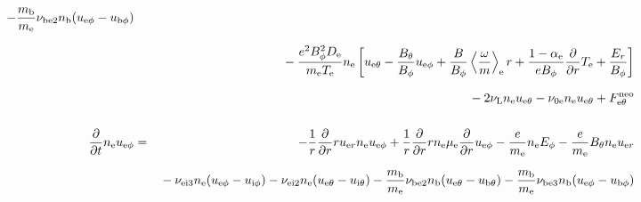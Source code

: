 \documentclass[11pt]{article}
\def\r#1{{\rm#1}}
\def\ddt{\frac{\partial}{\partial t}}
\def\ddr{\frac{\partial}{\partial r}}
\def\ave#1{\left\langle#1\right\rangle}
\def\me{m_\r{e}}
\def\mb{m_\r{b}}
\def\mue{\mu_\r{e}}
\def\mui{\mu_\r{i}}
\def\De{D_\r{e}}
\def\Di{D_\r{i}}
\def\nee{n_\r{e}}
\def\ni{n_\r{i}}
\def\nb{n_\r{b}}
\def\uer{u_{\r{e}r}}
\def\ueth{u_{\r{e}\theta}}
\def\uith{u_{\r{i}\theta}}
\def\ubth{u_{\r{b}\theta}}
\def\ueph{u_{\r{e}\phi}}
\def\uiph{u_{\r{i}\phi}}
\def\ubph{u_{\r{b}\phi}}
\def\Er{E_r}
\def\Eph{E_\phi}
\def\Bth{B_\theta}
\def\Bph{B_\phi}
\def\Te{T_\r{e}}
\def\Ti{T_\r{i}}
\def\Zi{Z_\r{i}}
\def\nune{\nu_\r{0e}}
\def\nuL{\nu_\r{L}}
\newcommand{\Frac}[2]{%
  {\displaystyle {\displaystyle #1\over \displaystyle #2}}%
}
\newcommand{\rdprd}[2]{\Frac{\partial #1}{\partial #2}}
\newcommand{\aveaveB}[1]{\left< \!\! \left< #1 \right> \!\! \right>}
\begin{document}
\begin{eqnarray}
%
  - \frac{\mb}{\me} \nu_\r{be2} \nb (\ueph - \ubph)
\nonumber\\[2.5mm]&&{}
%
%
  - \frac{e^2 \Bph^2 \De}{\me\Te}\nee
    \left[\ueth - \frac{\Bth}{\Bph}\ueph
     + \frac{B}{\Bph}\ave{\frac{\omega}{m}}_\r{e} r
     + \frac{1-\alpha_\r{e}}{e\Bph}\ddr \Te + \frac{\Er}{\Bph}\right]
%
\nonumber\\[2.5mm]&&{}
%
%
  - 2 \nuL \nee \ueth
%
  - \nune \nee \ueth
%
%
%
%
  + F_{\r{e}\theta}^\r{neo}
\\[5mm]
  \ddt \nee \ueph &=&
%
  - \frac{1}{r} \ddr r \uer \nee \ueph
%
  + \frac{1}{r} \ddr r \nee \mue \ddr \ueph
%
  - \frac{e}{\me} \nee \Eph
%
  - \frac{e}{\me} \Bth \nee \uer 
\nonumber\\[2.5mm]&&{}
%
  - \nu_\r{ei3} \nee (\ueph - \uiph)
%
  - \nu_\r{ei2} \nee (\ueth - \uith)
%
  - \frac{\mb}{\me} \nu_\r{be2} \nb (\ueth - \ubth)
%
  - \frac{\mb}{\me} \nu_\r{be3} \nb (\ueph - \ubph)
\nonumber\\[2.5mm]&&{}
%
%

\end{eqnarray}
\end{document}

